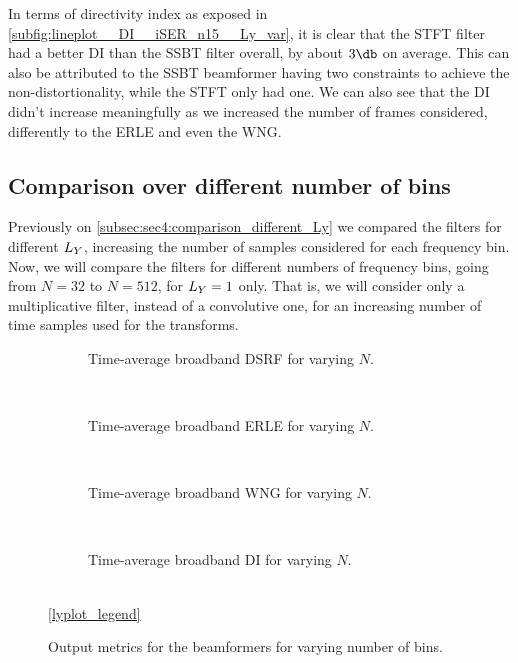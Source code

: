 In terms of directivity index as exposed in \cref{subfig:lineplot__DI__iSER_n15__Ly_var}, it is clear that the STFT filter had a better DI than the SSBT filter overall, by about $3 \dB$ on average. This can also be attributed to the SSBT beamformer having two constraints to achieve the non-distortionality, while the STFT only had one. We can also see that the DI didn't increase meaningfully as we increased the number of frames considered, differently to the ERLE and even the WNG.


\subsection{Comparison over different number of bins}

Previously on \cref{subsec:sec4:comparison_different_Ly} we compared the filters for different $\Ly$, increasing the number of samples considered for each frequency bin. Now, we will compare the filters for different numbers of frequency bins, going from $N = 32$ to $N = 512$, for $\Ly = 1$ only. That is, we will consider only a multiplicative filter, instead of a convolutive one, for an increasing number of time samples used for the transforms.


\begin{figure}[!t]
	\centering
	\begin{subfigure}{\textwidth}
		\centering
		
		\caption{Time-average broadband DSRF for varying $N$.}
		\label{subfig:lineplot__DSRF__N_var__iSER_n15}
	\end{subfigure}\\[1em]
	\begin{subfigure}{\textwidth}
		\centering
		
		\caption{Time-average broadband ERLE for varying $N$.}
		\label{subfig:lineplot__ERLE__N_var__iSER_n15}
	\end{subfigure}\\[1em]
	\begin{subfigure}{\textwidth}
		\centering
		
		\caption{Time-average broadband WNG for varying $N$.}
		\label{subfig:lineplot__WNG__N_var__iSER_n15}
	\end{subfigure}\\[1em]
	\begin{subfigure}{\textwidth}
		\centering
		
		\caption{Time-average broadband DI for varying $N$.}
		\label{subfig:lineplot__DI__N_var__iSER_n15}
	\end{subfigure}\\[1em]
	\ref*{lyplot_legend}
	\caption{Output metrics for the beamformers for varying number of bins.}
	\label{fig:lineplot__N_var__iSER_n15__Ly_1}
\end{figure}

